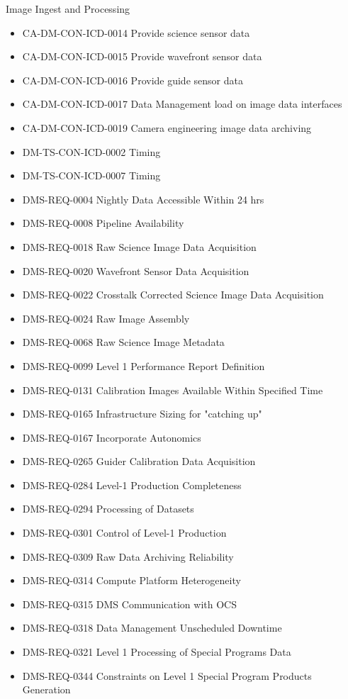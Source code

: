 Image Ingest and Processing \begin{itemize}
\item CA-DM-CON-ICD-0014 Provide science sensor data
\item CA-DM-CON-ICD-0015 Provide wavefront sensor data
\item CA-DM-CON-ICD-0016 Provide guide sensor data
\item CA-DM-CON-ICD-0017 Data Management load on image data interfaces
\item CA-DM-CON-ICD-0019 Camera engineering image data archiving
\item DM-TS-CON-ICD-0002 Timing
\item DM-TS-CON-ICD-0007 Timing
\item DMS-REQ-0004 Nightly Data Accessible Within 24 hrs
\item DMS-REQ-0008 Pipeline Availability
\item DMS-REQ-0018 Raw Science Image Data Acquisition
\item DMS-REQ-0020 Wavefront Sensor Data Acquisition
\item DMS-REQ-0022 Crosstalk Corrected Science Image Data Acquisition
\item DMS-REQ-0024 Raw Image Assembly
\item DMS-REQ-0068 Raw Science Image Metadata
\item DMS-REQ-0099 Level 1 Performance Report Definition
\item DMS-REQ-0131 Calibration Images Available Within Specified Time
\item DMS-REQ-0165 Infrastructure Sizing for "catching up"
\item DMS-REQ-0167 Incorporate Autonomics
\item DMS-REQ-0265 Guider Calibration Data Acquisition
\item DMS-REQ-0284 Level-1 Production Completeness
\item DMS-REQ-0294 Processing of Datasets
\item DMS-REQ-0301 Control of Level-1 Production
\item DMS-REQ-0309 Raw Data Archiving Reliability
\item DMS-REQ-0314 Compute Platform Heterogeneity
\item DMS-REQ-0315 DMS Communication with OCS
\item DMS-REQ-0318 Data Management Unscheduled Downtime
\item DMS-REQ-0321 Level 1 Processing of Special Programs Data
\item DMS-REQ-0344 Constraints on Level 1 Special Program Products Generation

\end{itemize}
